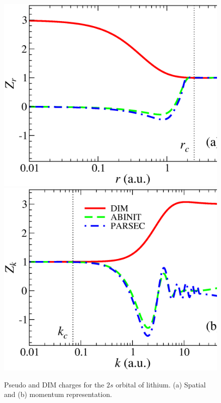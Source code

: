 \documentclass[10pt]{article}
\begin{document}
\begin{figure}[H]
\centering
 \includegraphics[height=0.23\textheight]{figures/pseudopot/ZLi.eps}
\hspace{0.2cm}
 \includegraphics[height=0.23\textheight]{figures/pseudopot/ZLik.eps}
 \caption{Pseudo and DIM charges for the $2s$ orbital of lithium. 
 (a) Spatial and (b) momentum representation.}
 \label{fig:ZLi}
\end{figure}
\end{document}
